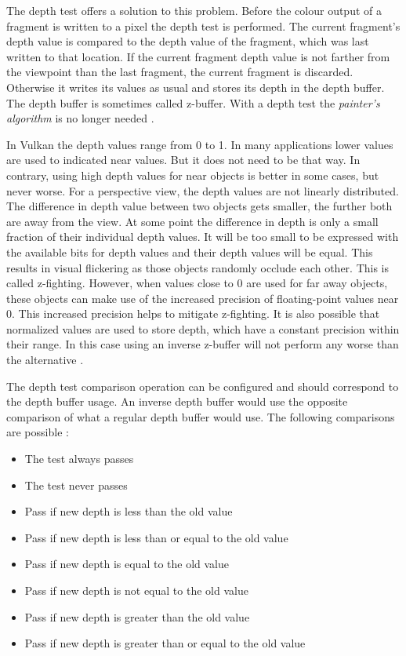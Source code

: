 The depth test offers a solution to this problem. Before the colour output of a fragment is written to a pixel the depth test is performed. The current fragment's depth value is compared to the depth value of the fragment, which was last written to that location.
If the current fragment depth value is not farther from the viewpoint than the last fragment, the current fragment is discarded. Otherwise it writes its values as usual and stores its depth in the depth buffer. The depth buffer is sometimes called z-buffer. With a depth test the \textit{painter's algorithm} is no longer needed \cite{akine:2018:realtime}.

In Vulkan the depth values range from 0 to 1. In many applications lower values are used to indicated near values. But it does not need to be that way. In contrary, using high depth values for near objects is better in some cases, but never worse. For a perspective view, the depth values are not linearly distributed. The difference in depth value between two objects gets smaller, the further both are away from the view. At some point the difference in depth is only a small fraction of their individual depth values. It will be too small to be expressed with the available bits for depth values and their depth values will be equal. This results in visual flickering as those objects randomly occlude each other. This is called z-fighting. However, when values close to 0 are used for far away objects, these objects can make use of the increased precision of floating-point values near 0. This increased precision helps to mitigate z-fighting. It is also possible that normalized values are used to store depth, which have a constant precision within their range. In this case using an inverse z-buffer will not perform any worse than the alternative \cite{lapidous:1999:optimal, nvidia:inversez}.

The depth test comparison operation can be configured and should correspond to the depth buffer usage. An inverse depth buffer would use the opposite comparison of what a regular depth buffer would use. The following comparisons are possible \cite{sellers:vulkanprogramming}:
\begin{itemize}
	\item The test always passes
	\item The test never passes
	\item Pass if new depth is less than the old value
	\item Pass if new depth is less than or equal to the old value
	\item Pass if new depth is equal to the old value
	\item Pass if new depth is not equal to the old value
	\item Pass if new depth is greater than the old value
	\item Pass if new depth is greater than or equal to the old value	
\end{itemize}


